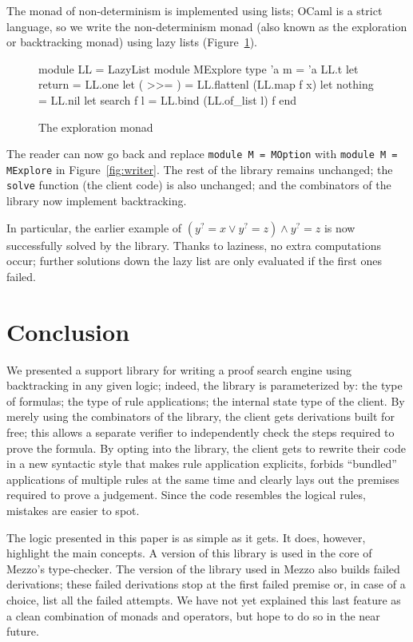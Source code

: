 \documentclass{easychair}
\def\li{\lstinline}
\newcommand{\fref}[1]{Figure~\ref{fig:#1}}
\newcommand{\f}[1]{\ensuremath{#1^?}} %
\begin{document}
The monad of non-determinism is implemented using lists; OCaml is a strict
language, so we write the non-determinism monad (also known as the exploration
or backtracking monad) using lazy lists (\fref{mexplore}).

\begin{figure}
  \centering
\begin{ocaml}
module LL = LazyList
module MExplore
  type 'a m = 'a LL.t
  let return = LL.one
  let ( >>= ) = LL.flattenl (LL.map f x)
  let nothing = LL.nil
  let search f l = LL.bind (LL.of_list l) f
end
\end{ocaml}
  \caption{The exploration monad}
  \label{fig:mexplore}
\end{figure}

The reader can now go back and replace \li+module M = MOption+ with
\li+module M = MExplore+ in \fref{writer}. The rest of the library remains
unchanged; the \li+solve+ function (the client code) is also unchanged; and the
combinators of the library now implement backtracking.

In particular, the earlier example of $(\f y = x \vee \f y = z) \wedge \f y = z$ is now successfully solved by the
library. Thanks to laziness, no extra computations occur; further solutions down
the lazy list are only evaluated if the first ones failed.

\section{Conclusion}

We presented a support library for writing a proof search engine using backtracking in
any given logic; indeed, the library is parameterized by: the type of formulas; the type of
rule applications; the internal state type of the client. By merely using the
combinators of the library, the client gets derivations built for free; this allows
a separate verifier to independently check the steps required to prove the
formula. By opting into the library, the client gets to rewrite their code in a
new syntactic style that makes rule application explicits, forbids ``bundled''
applications of multiple rules at the same time and clearly lays out the
premises required to prove a judgement. Since the code resembles the logical
rules, mistakes are easier to spot.

The logic presented in this paper is as simple as it gets. It does, however,
highlight the main concepts. A version of this library is used in the core of
Mezzo's type-checker. The version of the library used in Mezzo also builds
failed derivations; these failed derivations stop at the first failed premise
or, in case of a choice, list all the failed attempts. We have not yet explained
this last feature as a clean combination of monads and operators, but hope to do
so in the near future.



\end{document}
